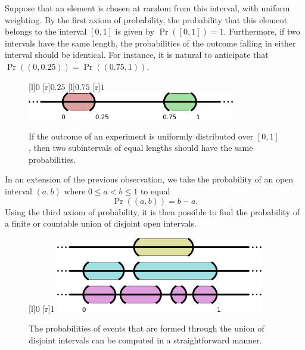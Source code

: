 Suppose that an element is chosen at random from this interval, with uniform weighting.
By the first axiom of probability, the probability that this element belongs to the interval $[0,1]$ is given by $\Pr \left( [0,1] \right) = 1$.
Furthermore, if two intervals have the same length, the probabilities of the outcome falling in either interval should be identical.
For instance, it is natural to anticipate that $\Pr \left( \left( 0, 0.25 \right) \right) = \Pr \left( \left( 0.75, 1 \right) \right)$.

\begin{figure}[htb!]
\begin{center}
\begin{psfrags}
[l]{$0$}
[r]{$0.25$}
[l]{$0.75$}
[r]{$1$}
\includegraphics[height=1.185cm]{Figures/2Chapter/intervals}
\end{psfrags}
\caption{If the outcome of an experiment is uniformly distributed over $[0,1]$, then two subintervals of equal lengths should have the same probabilities.}
\end{center}
\end{figure}

In an extension of the previous observation, we take the probability of an open interval $(a, b)$ where $0 \leq a < b \leq 1$ to equal
\begin{equation} \label{equation:DefinitionProbabilityLaw1}
\Pr ( (a,b) ) = b - a .
\end{equation}
Using the third axiom of probability, it is then possible to find the probability of a finite or countable union of disjoint open intervals.

\begin{figure}[htb!]
\begin{center}
\begin{psfrags}
[l]{$0$}
[r]{$1$}
\includegraphics[height=3.28cm]{Figures/2Chapter/lineintervals}
\end{psfrags}
\caption{The probabilities of events that are formed through the union of disjoint intervals can be computed in a straightforward manner.}
\end{center}
\end{figure}

